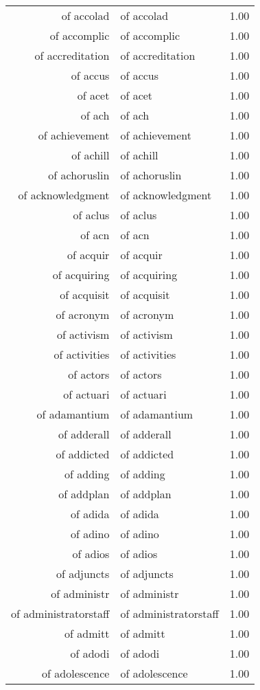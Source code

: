 \begin{table}[ht]
\begin{tabular}{rlr}
  of accolad & of accolad & 1.00 \\ 
  of accomplic & of accomplic & 1.00 \\ 
  of accreditation & of accreditation & 1.00 \\ 
  of accus & of accus & 1.00 \\ 
  of acet & of acet & 1.00 \\ 
  of ach & of ach & 1.00 \\ 
  of achievement & of achievement & 1.00 \\ 
  of achill & of achill & 1.00 \\ 
  of achoruslin & of achoruslin & 1.00 \\ 
  of acknowledgment & of acknowledgment & 1.00 \\ 
  of aclus & of aclus & 1.00 \\ 
  of acn & of acn & 1.00 \\ 
  of acquir & of acquir & 1.00 \\ 
  of acquiring & of acquiring & 1.00 \\ 
  of acquisit & of acquisit & 1.00 \\ 
  of acronym & of acronym & 1.00 \\ 
  of activism & of activism & 1.00 \\ 
  of activities & of activities & 1.00 \\ 
  of actors & of actors & 1.00 \\ 
  of actuari & of actuari & 1.00 \\ 
  of adamantium & of adamantium & 1.00 \\ 
  of adderall & of adderall & 1.00 \\ 
  of addicted & of addicted & 1.00 \\ 
  of adding & of adding & 1.00 \\ 
  of addplan & of addplan & 1.00 \\ 
  of adida & of adida & 1.00 \\ 
  of adino & of adino & 1.00 \\ 
  of adios & of adios & 1.00 \\ 
  of adjuncts & of adjuncts & 1.00 \\ 
  of administr & of administr & 1.00 \\ 
  of administratorstaff & of administratorstaff & 1.00 \\ 
  of admitt & of admitt & 1.00 \\ 
  of adodi & of adodi & 1.00 \\ 
  of adolescence & of adolescence & 1.00 \\ 

\end{tabular}
\end{table}
